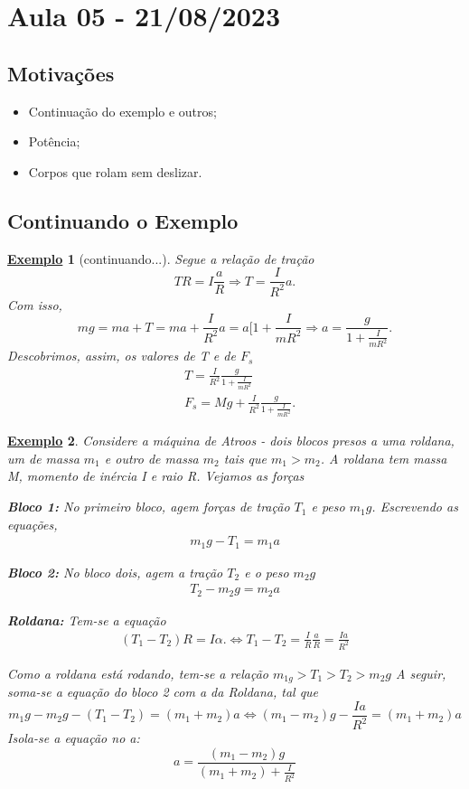 \documentclass{article}
\newtheorem{example}{\underline{Exemplo}}
\begin{document}
\section{Aula 05 - 21/08/2023}
\subsection{Motivações}
\begin{itemize}
  \item Continuação do exemplo e outros;
  \item Potência;
  \item Corpos que rolam sem deslizar.
\end{itemize}
\subsection{Continuando o Exemplo}
\begin{example}[continuando...]
  Segue a relação de tração 
    \[
      TR = I \frac{a}{R} \Rightarrow T = \frac{I}{R^{2}}a.
    \] 
  Com isso, 
    \[
      mg = ma + T = ma + \frac{I}{R^{2}}a = a[1 + \frac{I}{mR^{2}} \Rightarrow a = \frac{g}{1 + \frac{I}{mR^{2}}}.
    \]
  Descobrimos, assim, os valores de T e de \(F_{s}\)
 \begin{align*}
   &T = \frac{I}{R^{2}}\frac{g}{1+ \frac{I}{mR^{2}}}\\
   &F_{s} = Mg + \frac{I}{R^{2}}\frac{g}{1+\frac{I}{mR^{2}}}.
 \end{align*}
 \end{example} 
\begin{example}
  Considere a máquina de Atroos - dois blocos presos a uma roldana, um de massa \(m_{1}\) e outro de massa \(m_{2}\) tais que \(m_{1} > m_{2}\).
A roldana tem massa M, momento de inércia I e raio R. Vejamos as forças

  \textbf{Bloco 1:}
    No primeiro bloco, agem forças de tração \(T_{1}\) e peso \(m_{1}g\). Escrevendo as equações,
   \begin{align*}
     m_{1}g - T_{1} = m_{1}a
   \end{align*}

  \textbf{Bloco 2:}
    No bloco dois, agem a tração \(T_{2}\) e o peso \(m_{2}g\)
   \begin{align*}
     T_{2}-m_{2}g = m_{2}a
   \end{align*}

  \textbf{Roldana:}
    Tem-se a equação 
   \begin{align*}
     (T_{1} - T_{2})R = I\alpha. \Longleftrightarrow T_{1} - T_{2} = \frac{I}{R}\frac{a}{R} = \frac{Ia}{R^{2}}
   \end{align*}

  Como a roldana está rodando, tem-se a relação \(m_{1g} > T_{1} > T_{2} > m_{2}g\)
A seguir, soma-se a equação do bloco 2 com a da Roldana, tal que 
  \[
    m_{1}g - m_{2}g - (T_{1}-T_{2}) = (m_{1}+m_{2})a \Longleftrightarrow (m_{1}-m_{2})g - \frac{Ia}{R^{2}} = (m_{1}+m_{2})a
  \]
  Isola-se a equação no a: 
    \[
      a = \frac{(m_{1}-m_{2})g}{(m_{1}+m_{2})+\frac{I}{R^{2}}}
    \]
\end{example}
\end{document}
